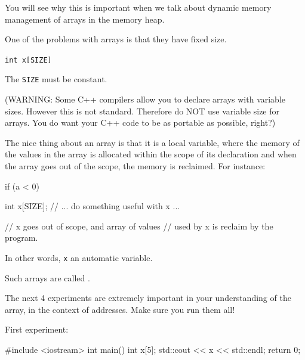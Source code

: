 You will see why this is important when we talk about dynamic memory management of arrays in the memory heap.










\newpage{}

One of the problems with arrays is that they have fixed size.

\verb!int x[SIZE]!

The \texttt{SIZE} must be constant.

(WARNING: Some C++ compilers allow you to declare arrays with variable sizes. However this is not standard. Therefore do NOT use variable size for arrays. You do want your C++ code to be as portable as possible, right?)

The nice thing about an array is that it is a local variable, where the memory of the values in the array is allocated within the scope of its declaration and when the array goes out of the scope, the memory is reclaimed. For instance:

\begin{consolethree}[escapeinside=||]
if (a < 0)
{
    int x[SIZE];
    // ... do something useful with x ...

} // x goes out of scope, and array of values
  // used by x is reclaim by the program.
\end{consolethree}

In other words, \texttt{x} an automatic variable.

Such arrays are called .

The next 4 experiments are extremely important in your understanding of the array, in the context of addresses. Make sure you run them all!

First experiment:

\begin{consolethree}[escapeinside=||]
#include <iostream>
int main()
{
    int x[5];
    std::cout << x << std::endl;
    return 0;
}
\end{consolethree}


